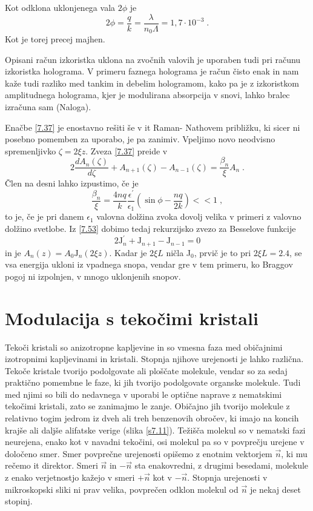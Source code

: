 \documentclass[11pt,fleqn]{book} %
\begin{document}
Kot odklona uklonjenega vala $2\phi$ je 
\begin{equation}
2\phi=\frac{q}{k}=\frac{\lambda}{n_{0}\Lambda}=1,7\cdot10^{-3}\;.\label{7.52}
\end{equation}
 Kot je torej precej majhen.

Opisani račun izkoristka uklona na zvočnih valovih je uporaben tudi
pri računu izkoristka holograma. V primeru faznega holograma je račun
čisto enak in nam kaže tudi razliko med tankim in debelim hologramom,
kako pa je z izkoristkom amplitudnega holograma, kjer je modulirana
absorpcija v snovi, lahko bralec izračuna sam (Naloga).

Enačbe \ref{7.37} je enostavno rešiti še v {it Raman- Nathovem približku},
ki sicer ni posebno pomemben za uporabo, je pa zanimiv. Vpeljimo novo
neodvisno spremenljivko $\zeta=2\xi z$. Zveza \ref{7.37} preide
v 
\begin{equation}
2\frac{dA_{n}(\zeta)}{d\zeta}+A_{n+1}(\zeta)-A_{n-1}(\zeta)=\frac{\beta_{n}}{\xi}A_{n}\;.\label{7.53}
\end{equation}
 Člen na desni lahko izpustimo, če je 
\begin{equation}
\frac{\beta_{n}}{\xi}=\frac{4nq}{k}\frac{\epsilon^{\prime}}{\epsilon_{1}}(\sin\phi-\frac{nq}{2k})<<1\;,\label{7.54}
\end{equation}
 to je, če je pri danem $\epsilon_{1}$ valovna dolžina zvoka dovolj
velika v primeri z valovno dolžino svetlobe. Iz \ref{7.53} dobimo
tedaj rekurzijsko zvezo za Besselove funkcije 
\begin{equation}
2\mbox{J}_{n}^{\prime}+\mbox{J}_{n+1}-\mbox{J}_{n-1}=0\label{7.55}
\end{equation}
 in je $A_{n}(z)=A_{0}\mbox{J}_{n}(2\xi z)$. Kadar je $2\xi L$ ničla
J$_{0}$, prvič je to pri $2\xi L=2.4$, se vsa energija ukloni iz
vpadnega snopa, vendar gre v tem primeru, ko Braggov pogoj ni izpolnjen,
v mnogo uklonjenih snopov.


\section{Modulacija s tekočimi kristali}

Tekoči kristali so anizotropne kapljevine in so vmesna faza med običajnimi
izotropnimi kapljevinami in kristali. Stopnja njihove urejenosti je
lahko različna. Tekoče kristale tvorijo podolgovate ali ploščate molekule,
vendar so za sedaj praktično pomembne le faze, ki jih tvorijo podolgovate
organske molekule. Tudi med njimi so bili do nedavnega v uporabi le
optične naprave z nematskimi tekočimi kristali, zato se zanimajmo
le zanje. Običajno jih tvorijo molekule z relativno togim jedrom iz
dveh ali treh benzenovih obročev, ki imajo na koncih krajše ali daljše
alifatske verige (slika \ref{s7.11}). Težišča molekul so v nematski
fazi neurejena, enako kot v navadni tekočini, osi molekul pa so v
povprečju urejene v določeno smer. Smer povprečne urejenosti opišemo
z enotnim vektorjem $\vec{n}$, ki mu rečemo {it direktor}. Smeri
$\vec{n}$ in $-\vec{n}$ sta enakovredni, z drugimi besedami, molekule
z enako verjetnostjo kažejo v smeri $+\vec{n}$ kot v $-\vec{n}$.
Stopnja urejenosti v mikroskopski sliki ni prav velika, povprečen
odklon molekul od $\vec{n}$ je nekaj deset stopinj.
\end{document}

